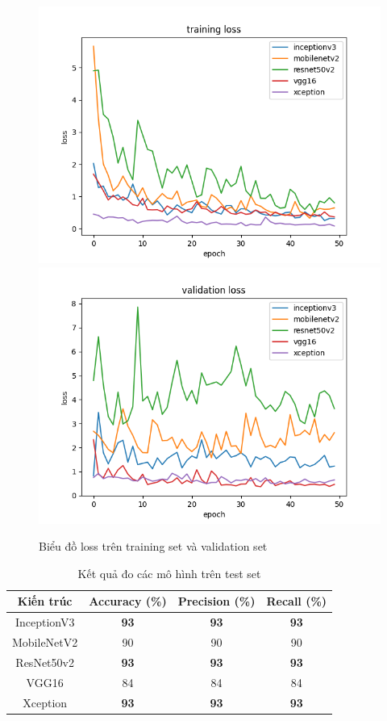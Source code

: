 \documentclass[a4paper,14pt]{extarticle}
\begin{document}
	\begin{figure}[H]
		\centering
		\includegraphics[scale=0.45]{images/loss.png}
		\includegraphics[scale=0.45]{images/val_loss.png}
		\caption{Biểu đồ loss trên training set và validation set}
	\end{figure}
	
	\begin{table}[H]
		\centering
		\begin{tabular}{|c|c|c|c|}
			\hline
			Kiến trúc   & Accuracy (\%) & Precision (\%) & Recall (\%) \\ \hline
			InceptionV3 & \textbf{93}   & \textbf{93}    & \textbf{93} \\
			MobileNetV2 & 90            & 90             & 90          \\
			ResNet50v2  & \textbf{93}   & \textbf{93}    & \textbf{93} \\
			VGG16       & 84            & 84             & 84          \\
			Xception    & \textbf{93}   & \textbf{93}    & \textbf{93} \\ \hline
		\end{tabular}
		\caption{Kết quả đo các mô hình trên test set}
	\end{table}
\end{document}
